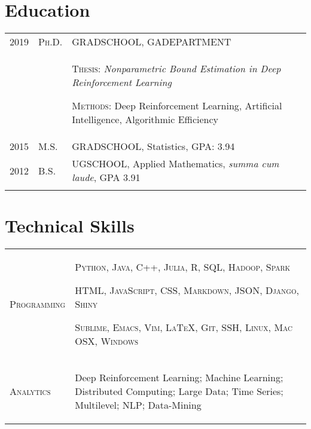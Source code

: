 \documentclass[a4paper,10pt]{article}
\begin{document}
\section{Education}
\begin{supertabular}{p{2cm} p{1.0cm} p{13.9cm}}
	\textsc{2019}		&		\textsc{Ph.D.} & \textsc{GRADSCHOOL}, \small GADEPARTMENT \\
					&&		 \begin{enumerate*}[label =$\circ$, itemjoin={\newline}] 
							 \item \footnotesize \textsc{Thesis:} \emph{Nonparametric Bound Estimation in Deep Reinforcement Learning} 
							 \item \footnotesize  \textsc{Methods:} Deep Reinforcement Learning, Artificial Intelligence, Algorithmic Efficiency
							 \end{enumerate*}  \\
	\textsc{2015} 	& 	\textsc{M.S.} & \textsc{GRADSCHOOL}, \small Statistics, GPA: 3.94  \\
	\textsc{2012} 	& 	\textsc{B.S.} & \textsc{UGSCHOOL}, \small Applied Mathematics, \emph{summa cum laude}, GPA 3.91 \\
	 \\
\end{supertabular}


\section{Technical Skills}
\begin{supertabular}{p{3.4cm} p{13.9cm}}

	\textsc{Programming}			& \begin{enumerate*}[label =$\circ$, itemjoin={\newline}]
																\item \small \textsc{Python, Java, C++, Julia, R, SQL, Hadoop, Spark}
																\item \small \textsc{HTML, JavaScript, CSS, Markdown, JSON, Django, Shiny}
																\item \small \textsc{Sublime, Emacs, Vim, {\fb \LaTeX}, Git, SSH, Linux, Mac OSX, Windows }
																\end{enumerate*} \vspace{2mm} \\


	\textsc{Analytics}				& \begin{enumerate*}[label =$\circ$, itemjoin={\newline}]
                                \item \small Deep Reinforcement Learning; Machine Learning; Distributed Computing; Large Data; Time Series; Multilevel; NLP; Data-Mining \end{enumerate*}  \vspace{1mm} \\



\end{supertabular}
\end{document}
